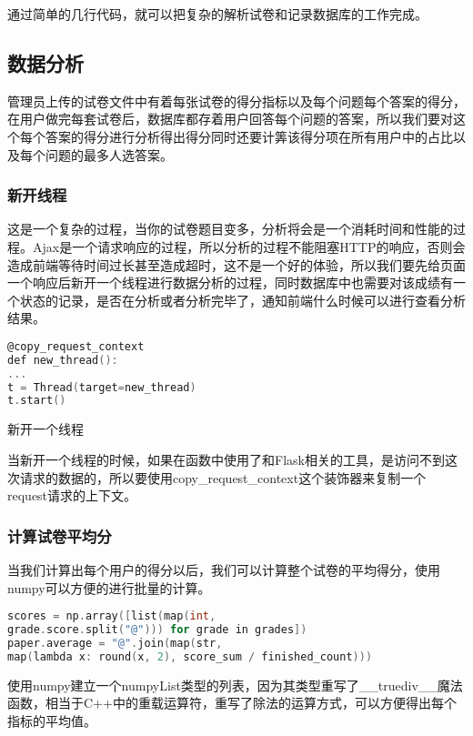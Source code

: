 通过简单的几行代码，就可以把复杂的解析试卷和记录数据库的工作完成。

\subsection{数据分析}

管理员上传的试卷文件中有着每张试卷的得分指标以及每个问题每个答案的得分，在用户做完每套试卷后，数据库都存着用户回答每个问题的答案，所以我们要对这个每个答案的得分进行分析得出得分同时还要计筭该得分项在所有用户中的占比以及每个问题的最多人选答案。

\subsubsection{新开线程}

这是一个复杂的过程，当你的试卷题目变多，分析将会是一个消耗时间和性能的过程。Ajax是一个请求响应的过程，所以分析的过程不能阻塞HTTP的响应，否则会造成前端等待时间过长甚至造成超时，这不是一个好的体验，所以我们要先给页面一个响应后新开一个线程进行数据分析的过程，同时数据库中也需要对该成绩有一个状态的记录，是否在分析或者分析完毕了，通知前端什么时候可以进行查看分析结果。

\begin{lstlisting}[language=C]
@copy_request_context
def new_thread():
...
t = Thread(target=new_thread)
t.start()
\end{lstlisting}

\begin{center}
	{\small 新开一个线程}
\end{center}

当新开一个线程的时候，如果在函数中使用了和Flask相关的工具，是访问不到这次请求的数据的，所以要使用copy\_request\_context这个装饰器来复制一个request请求的上下文。

\subsubsection{计算试卷平均分}

当我们计算出每个用户的得分以后，我们可以计算整个试卷的平均得分，使用numpy可以方便的进行批量的计算。

\begin{lstlisting}[language=C]
scores = np.array([list(map(int, 
grade.score.split("@"))) for grade in grades])
paper.average = "@".join(map(str, 
map(lambda x: round(x, 2), score_sum / finished_count)))
\end{lstlisting}

使用numpy建立一个numpyList类型的列表，因为其类型重写了\_\_truediv\_\_魔法函数，相当于C++中的重载运算符，重写了除法的运算方式，可以方便得出每个指标的平均值。


